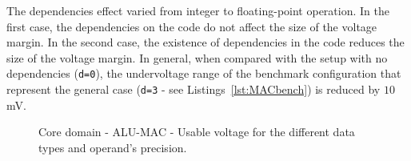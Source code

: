 The dependencies effect varied from integer to floating-point operation. In the first case, the dependencies on the code do not affect the size of the voltage margin. In the second case, the existence of dependencies in the code reduces the size of the voltage margin. In general, when compared with the setup with no dependencies (\texttt{d=0}), the undervoltage range of the benchmark configuration that represent the general case (\texttt{d=3} - see Listings~\ref{lst:MACbench}) is reduced by $10$mV. 


\begin{figure}[!htb]
    \centering
    \begin{subfigmatrix}{2}
      \label{fig:MAC_guardband}
    \end{subfigmatrix}
    \caption{Core domain - ALU-MAC - Usable voltage for the different data types and operand's precision.}
\end{figure}

